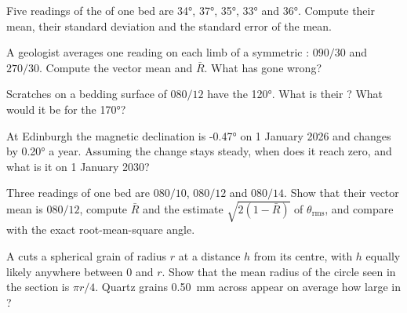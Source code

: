 \begin{exercise}[$\star\star$]\label{exo:b1:field-lab-methods-1:5}
Five readings of the  of one bed are \ang{34}, \ang{37}, \ang{35},
\ang{33} and \ang{36}. Compute their mean, their standard deviation and the
standard error of the mean.
\end{exercise}

\begin{exercise}[$\star\star$]\label{exo:b1:field-lab-methods-1:6}
A geologist averages one reading on each limb of a symmetric : $090/30$
and $270/30$. Compute the vector mean and $\bar R$. What has gone wrong?
\end{exercise}

\begin{exercise}[$\star\star$]\label{exo:b1:field-lab-methods-1:7}
Scratches on a bedding surface of  $080/12$ have the 
\ang{120}. What is their ? What would it be for the  \ang{170}?
\end{exercise}

\begin{exercise}[$\star\star$]\label{exo:b1:field-lab-methods-1:8}
At Edinburgh the magnetic declination is \ang{-0.47} on 1 January 2026 and
changes by \ang{+0.20} a year. Assuming the change stays steady, when does it
reach zero, and what is it on 1 January 2030?
\end{exercise}

\begin{exercise}[$\star\star$]\label{exo:b1:field-lab-methods-1:9}
Three readings of one bed are $080/10$, $080/12$ and $080/14$. Show that their
vector mean is $080/12$, compute $\bar R$ and the estimate
$\sqrt{2(1 - \bar R)}$ of $\theta_{\text{rms}}$, and compare with the exact
root-mean-square angle.
\end{exercise}

\begin{exercise}[$\star\star\star$]\label{exo:b1:field-lab-methods-1:10}
A  cuts a spherical grain of radius $r$ at a distance $h$ from its
centre, with $h$ equally likely anywhere between 0 and $r$. Show that the
mean radius of the circle seen in the section is $\pi r/4$. Quartz grains
\qty{0.50}{mm} across appear on average how large in ?
\end{exercise}

